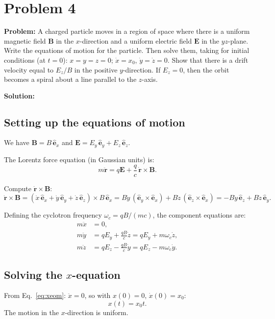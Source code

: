 \documentclass[12pt]{article}
\newcommand{\vect}[1]{\mathbf{#1}}
\newcommand{\ehat}[1]{\hat{\vect{e}}_{#1}}
\begin{document}
\section*{Problem 4}

\textbf{Problem:} A charged particle moves in a region of space where there is a uniform magnetic field $\vect{B}$ in the $x$-direction and a uniform electric field $\vect{E}$ in the $yz$-plane. Write the equations of motion for the particle. Then solve them, taking for initial conditions (at $t=0$): $x = y = z = 0$; $\dot{x} = x_0$, $\dot{y} = \dot{z} = 0$. Show that there is a drift velocity equal to $E_z/B$ in the positive $y$-direction. If $E_z = 0$, then the orbit becomes a spiral about a line parallel to the $z$-axis.

\bigskip
\textbf{Solution:}

\subsection*{Setting up the equations of motion}

We have $\vect{B} = B\,\ehat{x}$ and $\vect{E} = E_y\,\ehat{y} + E_z\,\ehat{z}$.

The Lorentz force equation (in Gaussian units) is:
\[
m\ddot{\vect{r}} = q\vect{E} + \frac{q}{c}\,\dot{\vect{r}} \times \vect{B}.
\]

Compute $\dot{\vect{r}} \times \vect{B}$:
\[
\dot{\vect{r}} \times \vect{B} = (\dot{x}\,\ehat{x} + \dot{y}\,\ehat{y} + \dot{z}\,\ehat{z}) \times B\,\ehat{x}
= B\dot{y}\,(\ehat{y}\times\ehat{x}) + B\dot{z}\,(\ehat{z}\times\ehat{x})
= -B\dot{y}\,\ehat{z} + B\dot{z}\,\ehat{y}.
\]

Defining the cyclotron frequency $\omega_c = qB/(mc)$, the component equations are:
\begin{align}
m\ddot{x} &= 0, \label{eq:xeom} \\
m\ddot{y} &= qE_y + \frac{qB}{c}\dot{z} = qE_y + m\omega_c \dot{z}, \label{eq:yeom} \\
m\ddot{z} &= qE_z - \frac{qB}{c}\dot{y} = qE_z - m\omega_c \dot{y}. \label{eq:zeom}
\end{align}

\subsection*{Solving the $x$-equation}

From Eq.~\eqref{eq:xeom}: $\ddot{x} = 0$, so with $x(0) = 0$, $\dot{x}(0) = x_0$:
\[
\boxed{x(t) = x_0 t}.
\]
The motion in the $x$-direction is uniform.
\end{document}
